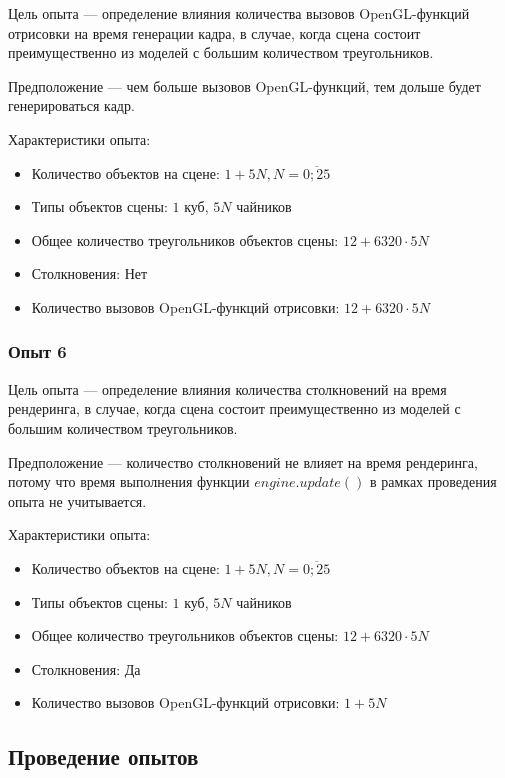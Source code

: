 Цель опыта --- определение влияния количества вызовов OpenGL-функций отрисовки на время генерации кадра, в случае, когда сцена состоит преимущественно из моделей с большим количеством треугольников.

Предположение --- чем больше вызовов OpenGL-функций, тем дольше будет генерироваться кадр.

Характеристики опыта:
\begin{itemize}
    \item Количество объектов на сцене: $1 + 5 N, N = \overline{0; 25}$
    \item Типы объектов сцены: $1$ куб, $5 N$ чайников
    \item Общее количество треугольников объектов сцены: $12 + 6320 \cdot 5 N$
    \item Столкновения: Нет
    \item Количество вызовов OpenGL-функций отрисовки: $12 + 6320 \cdot 5 N$
\end{itemize}

\subsubsection{Опыт 6}

Цель опыта --- определение влияния количества столкновений на время рендеринга, в случае, когда сцена состоит преимущественно из моделей с большим количеством треугольников.

Предположение --- количество столкновений не влияет на время рендеринга, потому что время выполнения функции $engine.update()$ в рамках проведения опыта не учитывается.

Характеристики опыта:
\begin{itemize}
    \item Количество объектов на сцене: $1 + 5 N, N = \overline{0; 25}$
    \item Типы объектов сцены: $1$ куб, $5 N$ чайников
    \item Общее количество треугольников объектов сцены: $12 + 6320 \cdot 5 N$
    \item Столкновения: Да
    \item Количество вызовов OpenGL-функций отрисовки: $1 + 5 N$
\end{itemize}

\subsection{Проведение опытов}

